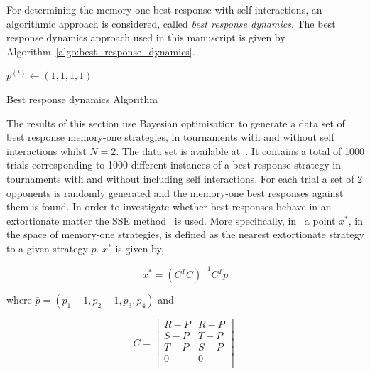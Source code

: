\documentclass[10pt]{article}
\begin{document}
For determining the memory-one best response with self interactions, an
algorithmic approach is considered, called \textit{best response dynamics}. The
best response dynamics approach used in this manuscript is given by
Algorithm~\ref{algo:best_response_dynamics}.

\begin{center}
\begin{minipage}{.55\textwidth}
\begin{algorithm}[H]
       $p^{(t)}\leftarrow (1, 1, 1, 1)$\;
       \caption{Best response dynamics Algorithm}
       \label{algo:best_response_dynamics}
\end{algorithm}
\end{minipage}
\end{center}

The results of this section use Bayesian optimisation to generate a data set of best response
memory-one strategies, in tournaments with and without self interactions whilst \(N=2\).
The data set is available at~\cite{glynatsi2019}. It contains a total of 1000 trials
corresponding to 1000 different instances of a best response strategy in
tournaments with and without including self interactions. For each trial a set of 2 opponents is
randomly generated and the memory-one best responses against them is found.
In order to investigate whether best responses
behave in an extortionate matter the SSE method~\cite{Knight2019} is used. More
specifically,
in~\cite{Knight2019} a point \(x^*\), in the space of memory-one strategies, is
defined as the nearest extortionate strategy to a given strategy \(p\). \(x^*\) is
given by,

\begin{equation}\label{eqn:x_star_formula}
    x^* = {\left(C^{T}C\right)}^{-1}C^{T}\bar{p}
\end{equation}

where \(\bar{p}=(p_1 - 1, p_2 - 1, p_3, p_4)\) and

\begin{equation}\label{eq:definition_of_C}
    C =
    \begin{bmatrix}
        R - P & R- P \\
        S - P & T- P \\
        T - P & S- P \\
        0     & 0 \\
    \end{bmatrix}.
\end{equation}
\end{document}
